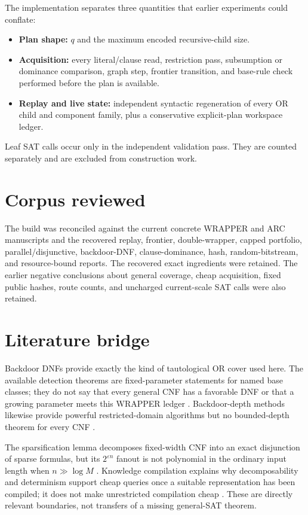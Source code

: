 \documentclass[11pt]{article}
\begin{document}
The implementation separates three quantities that earlier experiments could
conflate:
\begin{itemize}
\item[] \textbf{Plan shape:} $q$ and the maximum encoded recursive-child size.
\item[] \textbf{Acquisition:} every literal/clause read, restriction pass,
subsumption or dominance comparison, graph step, frontier transition, and
base-rule check performed before the plan is available.
\item[] \textbf{Replay and live state:} independent syntactic regeneration of
every OR child and component family, plus a conservative explicit-plan
workspace ledger.
\end{itemize}

Leaf SAT calls occur only in the independent validation pass.  They are
counted separately and are excluded from construction work.

\section{Corpus reviewed}

The build was reconciled against the current concrete WRAPPER and ARC
manuscripts and the recovered replay, frontier, double-wrapper, capped
portfolio, parallel/disjunctive, backdoor-DNF, clause-dominance, hash,
random-bitstream, and resource-bound reports.  The
recovered exact ingredients were retained.  The earlier negative conclusions
about general coverage, cheap acquisition, fixed public hashes, route counts,
and uncharged current-scale SAT calls were also retained.

\section{Literature bridge}

Backdoor DNFs provide exactly the kind of tautological OR cover used here.
The available detection theorems are fixed-parameter statements for named
base classes; they do not say that every general CNF has a favorable DNF or
that a growing parameter meets this WRAPPER ledger
\cite{ordyniak2021bdnf}.  Backdoor-depth methods likewise provide powerful
restricted-domain algorithms but no bounded-depth theorem for every CNF
\cite{dreier2022}.

The sparsification lemma decomposes fixed-width CNF into an exact disjunction
of sparse formulas, but its $2^{\varepsilon n}$ fanout is not polynomial in
the ordinary input length when $n\gg\log M$ \cite{ipz2001,calabro2010}.
Knowledge compilation explains why decomposability and determinism support
cheap queries once a suitable representation has been compiled; it does not
make unrestricted compilation cheap \cite{darwiche2002}.  These are directly
relevant boundaries, not transfers of a missing general-SAT theorem.
\end{document}
